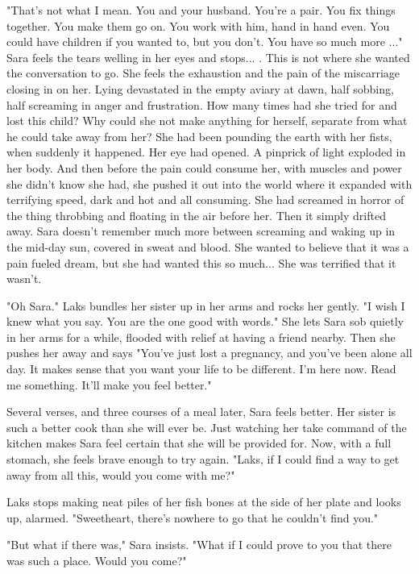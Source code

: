 \documentclass{article}
\begin{document}
"That's not what I mean. You and your husband. You're a pair. You fix things together. You make them go on. You work with him, hand in hand even. You could have children if you wanted to, but you don't. You have so much more ..." Sara feels the tears welling in her eyes and stops... . This is not where she wanted the conversation to go. She feels the exhaustion and the pain of the miscarriage closing in on her. Lying devastated in the empty aviary at dawn, half sobbing, half screaming in anger and frustration. How many times had she tried for and lost this child? Why could she not make anything for herself, separate from what he could take away from her? She had been pounding the earth with her fists, when suddenly it happened. Her eye had opened. A pinprick of light exploded in her body. And then before the pain could consume her, with muscles and power she didn't know she had, she pushed it out into the world where it expanded with terrifying speed, dark and hot and all consuming. She had screamed in horror of the thing throbbing and floating in the air before her. Then it simply drifted away. Sara doesn't remember much more between screaming and waking up in the mid-day sun, covered in sweat and blood. She wanted to believe that it was a pain fueled dream, but she had wanted this so much... She was terrified that it wasn't.

"Oh Sara." Laks bundles her sister up in her arms and rocks her gently. "I wish I knew what you say. You are the one good with words." She lets Sara sob quietly in her arms for a while, flooded with relief at having a friend nearby. Then she pushes her away and says "You've just lost a pregnancy, and you've been alone all day. It makes sense that you want your life to be different. I'm here now. Read me something. It'll make you feel better."

Several verses, and three courses of a meal later, Sara feels better. Her sister is such a better cook than she will ever be. Just watching her take command of the kitchen makes Sara feel certain that she will be provided for. Now, with a full stomach, she feels brave enough to try again. "Laks, if I could find a way to get away from all this, would you come with me?"

Laks stops making neat piles of her fish bones at the side of her plate and looks up, alarmed. "Sweetheart, there's nowhere to go that he couldn't find you."

"But what if there was," Sara insists. "What if I could prove to you that there was such a place. Would you come?"
\end{document}

